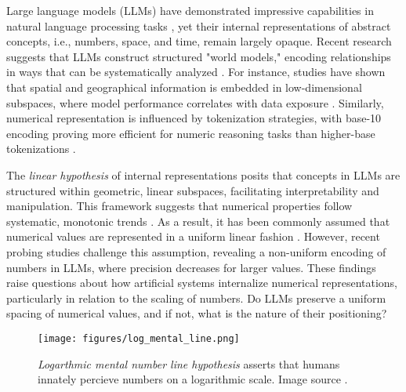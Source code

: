 Large language models (LLMs) have demonstrated impressive capabilities in natural language processing tasks \cite{touvron2023llama1,achiam2023gpt}, yet their internal representations of abstract concepts, i.e., numbers, space, and time, remain largely opaque. Recent research suggests that LLMs construct structured "world models," encoding relationships in ways that can be systematically analyzed \cite{petroni2019language,radford2019language}. For instance, studies have shown that spatial and geographical information is embedded in low-dimensional subspaces, where model performance correlates with data exposure \cite{gurneelanguage,godey2024scaling}. Similarly, numerical representation is influenced by tokenization strategies, with base-10 encoding proving more efficient for numeric reasoning tasks than higher-base tokenizations \cite{zhou2024scaling}.

The \textit{linear hypothesis} of internal representations \cite{park2023linear} posits that concepts in LLMs are structured within geometric, linear subspaces, facilitating interpretability and manipulation. This framework suggests that numerical properties follow systematic, monotonic trends \cite{heinzerling2024monotonic}. As a result, it has been commonly assumed that numerical values are represented in a uniform linear fashion \cite{zhu2025language}. However, recent probing studies \cite{zhu2025language,levy2024language} challenge this assumption, revealing a non-uniform encoding of numbers in LLMs, where precision decreases for larger values. These findings raise questions about how artificial systems internalize numerical representations, particularly in relation to the scaling of numbers. Do LLMs preserve a uniform spacing of numerical values, and if not, what is the nature of their positioning?


\begin{figure}[t]
    \centering
    \texttt{[image: figures/log\_mental\_line.png]} %
    \caption{\textit{Logarthmic mental number line hypothesis} asserts that humans innately percieve numbers on a logarithmic scale. Image source \cite{fritz2013development}.}
    \label{fig log line}
\end{figure}

